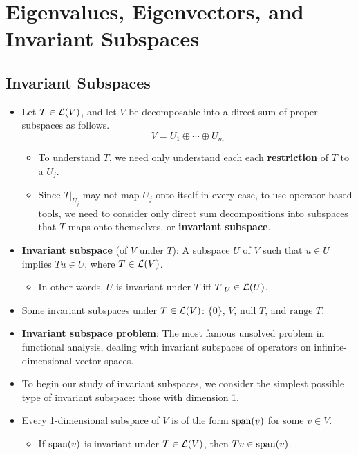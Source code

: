 \documentclass[../main.tex]{subfiles}
\begin{document}
\chapter{Eigenvalues, Eigenvectors, and Invariant Subspaces}
\section{Invariant Subspaces}
\begin{itemize}
    \item {}Let $T\in\mathcal{L}(V)$, and let $V$ be decomposable into a direct sum of proper subspaces as follows.
    \begin{equation*}
        V = U_1\oplus\cdots\oplus U_m
    \end{equation*}
    \begin{itemize}
        \item To understand $T$, we need only understand each each \textbf{restriction} of $T$ to a $U_j$.
        \item Since $T|_{U_j}$ may not map $U_j$ onto itself in every case, to use operator-based tools, we need to consider only direct sum decompositions into subspaces that $T$ maps onto themselves, or \textbf{invariant subspace}.
    \end{itemize}
    \item \textbf{Invariant subspace} (of $V$ under $T$): A subspace $U$ of $V$ such that $u\in U$ implies $Tu\in U$, where $T\in\mathcal{L}(V)$.
    \begin{itemize}
        \item In other words, $U$ is invariant under $T$ iff $T|_U\in\mathcal{L}(U)$.
    \end{itemize}
    \item Some invariant subspaces under $T\in\mathcal{L}(V)$: $\{0\}$, $V$, $\text{null }T$, and $\text{range }T$.
    \item \textbf{Invariant subspace problem}: The most famous unsolved problem in functional analysis, dealing with invariant subspaces of operators on infinite-dimensional vector spaces.
    \item To begin our study of invariant subspaces, we consider the simplest possible type of invariant subspace: those with dimension 1.
    \item Every 1-dimensional subspace of $V$ is of the form $\operatorname{span}(v)$ for some $v\in V$.
    \begin{itemize}
        \item If $\operatorname{span}(v)$ is invariant under $T\in\mathcal{L}(V)$, then $Tv\in\operatorname{span}(v)$.

\end{itemize}
\end{itemize}
\end{document}
